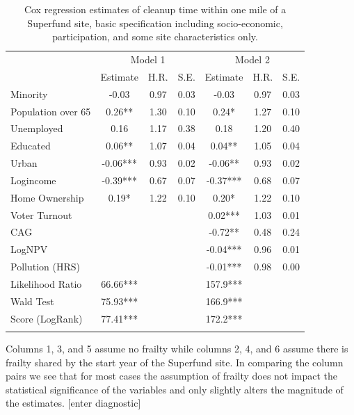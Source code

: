 \documentclass[12pt]{article}
\begin{document}
{\begin{table}[t]
	\centering	\footnotesize
	\caption{\small Cox regression estimates of cleanup time within one mile of a Superfund site, basic specification including socio-economic, participation, and some site characteristics only.} \label{cox1}
	\tabcolsep 9pt
		\begin{tabular}{lccc|ccc}
			\hline 
			& \multicolumn{3}{c}{Model 1 } & \multicolumn{3}{c}{Model 2 } \\ 
			& \multicolumn{1}{c}{Estimate}  & \multicolumn{1}{c}{H.R.}   & \multicolumn{1}{c}{S.E.}   & \multicolumn{1}{c}{Estimate}  & \multicolumn{1}{c}{H.R.}   & \multicolumn{1}{c}{S.E.}\\ \hline
			Minority & -0.03 & 0.97  & 0.03  & -0.03 & 0.97  & 0.03 \\
			Population over 65  &  0.26** & 1.30  & 0.10  &  0.24* & 1.27  & 0.10 \\
			Unemployed & 0.16  & 1.17  & 0.38  & 0.18  & 1.20  & 0.40 \\
			Educated &  0.06** & 1.07  & 0.04  &  0.04** & 1.05  & 0.04 \\
			Urban & -0.06*** & 0.93  & 0.02  & -0.06** & 0.93  & 0.02 \\
			Logincome & -0.39*** & 0.67  & 0.07  & -0.37*** & 0.68  & 0.07 \\
			Home Ownership &  0.19* & 1.22  & 0.10  &  0.20* & 1.22  & 0.10 \\
			Voter Turnout  &       &       &       &  0.02*** & 1.03  & 0.01 \\
			CAG   &       &       &       & -0.72** & 0.48  & 0.24 \\
			LogNPV &       &       &       & -0.04*** & 0.96  & 0.01 \\
			Pollution (HRS) &       &       &       & -0.01*** & 0.98  & 0.00 \\
			\hline
			Likelihood Ratio & 66.66***  & & &
			157.9*** &  & \\ 
			Wald Test & 75.93*** & & &
			166.9*** & & \\
			Score (LogRank) & 77.41*** & & &
			172.2*** &  & \\
			\hline
			\addlinespace[1ex]
			\multicolumn{3}{l}{\textsuperscript{***}$p\leq0.001$, 
				\textsuperscript{**}$p\leq0.01$, 
				\textsuperscript{*}$p\leq0.05$}
	\end{tabular}
\end{table}

Columns 1, 3, and 5 assume no frailty while columns 2, 4, and 6 assume there is frailty shared by the start year of the Superfund site. In comparing the column pairs we see that for most cases the assumption of frailty does not impact the statistical significance of the variables and only slightly alters the magnitude of the estimates. [enter diagnostic]

}
\end{document}
